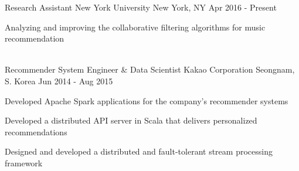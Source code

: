 \documentclass[12pt, a4paper]{awesome-cv}
\newif\iflong
\newcommand{\verbose}[1]{\iflong{#1}\fi}
\newcommand{\concise}[1]{\iflong\else{#1}\fi}
\newcommand{\shortlong}[2]{\iflong\textbf{#1}\xspace#2\else#1\fi}
\begin{document}
	\makecvheader
	
	\begin{cventries}
		\cventry
		{Research Assistant}
		{New York University}
		{New York, NY}
		{Apr 2016 - Present}
		{
			\begin{cvitems}
				\item \shortlong{Analyzing and improving the collaborative filtering algorithms for music recommendation}
				{at iHeartRadio, focusing on the relations between multiple entities using techniques including factorization machines, collective matrix factorization, and hypergraph learning.}
			\end{cvitems}
		}
		\concise{\\[-0.5em]}
		\cventry
		{Recommender System Engineer \& Data Scientist}
		{Kakao Corporation}
		{Seongnam, S. Korea}
		{Jun 2014 - Aug 2015}
		{
			\begin{cvitems}
				\item \shortlong{Developed Apache Spark applications for the company's recommender systems}
				{which were gradually being migrated from Apache Hive, and built a framework around Spark called CueSheet, which helps simplify the development cycle of Spark jobs by automating the application packaging and separating the concerns of the implementation and the configuration.}
				\item \shortlong{Developed a distributed API server in Scala that delivers personalized recommendations}
				{in various domains, which were precomputed and stored in the databases such as HBase and Couchbase. The deployment and scaling was managed using Marathon, and the system supported bucket testing for evaluating different recommendation algorithms on-line.}
				\item \shortlong{Designed and developed a distributed and fault-tolerant stream processing framework}
				{built atop Apache Kafka, providing stream manipulation primitives such as filter, transformer and joiner for the modular implementation of streaming jobs. Joiner, in particular, leveraged in-memory data grids to combine two input streams which may have arbitrarily ordered data  in real-time.}
				\verbose{
					\item \shortlong{Made a core utility library in Scala}
					{for the API servers and Spark applications being developed in the team, focusing on the simple and thread-safe usage. In addition to the basic IO and JSON conversion utilities, the library enabled easier nonblocking access to various endpoints that the team was using, including ElasticSearch, ZooKeeper, OpenTSDB, HBase, Couchbase, and HTTP servers.}
}
\end{cvitems}}
\end{cventries}
\end{document}
